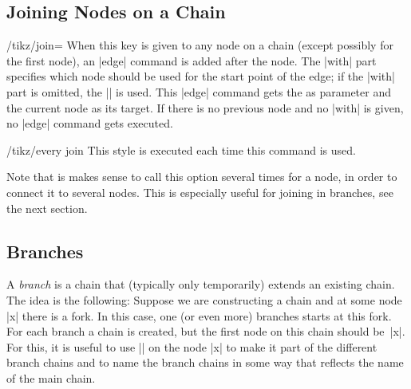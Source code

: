 \subsection{Joining Nodes on a Chain}

\begin{key}{/tikz/join=}
  When this key is given to any node on a chain (except possibly for
  the first node), an |edge| command is added after the node. The
  |with| part specifies which node should be used for the start point
  of the edge; if the |with| part is omitted, the |\tikzchainprevious|
  is used. This |edge| command gets the  as parameter
  and the current node as its target. If there is no
  previous node and no |with| is given, no |edge| command gets
  executed.
  \begin{stylekey}{/tikz/every join}
    This style is executed each time this command is used.
  \end{stylekey}

  Note that is makes sense to call this option several times for a
  node, in order to connect it to several nodes. This is especially
  useful for joining in branches, see the next section.
\begin{codeexample}[]
\end{codeexample}
\end{key}


\subsection{Branches}

A \emph{branch} is a chain that (typically only temporarily) extends
an existing chain. The idea is the following: Suppose we are
constructing a chain and at some node |x| there is a fork. In this
case, one (or even more) branches starts at this fork. For each branch
a chain is created, but the first node on this chain should
be~|x|. For this, it is useful to use |\chainin| on the node |x| to
make it part of the different branch chains and to name the branch
chains in some way that reflects the name of the main chain.

